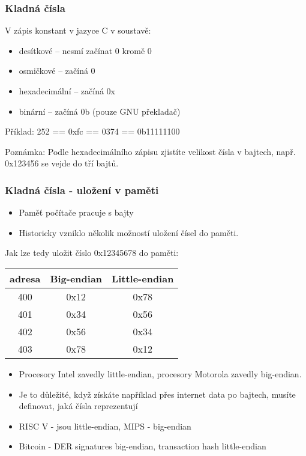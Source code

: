\documentclass{beamer}
\begin{document}
\begin{frame}
\frametitle{Kladná čísla}
V zápis konstant v jazyce C v soustavě:
\begin{itemize}
\item desítkové -- nesmí začínat 0 kromě 0
\item osmičkové -- začíná 0
\item hexadecimální -- začíná 0x
\item binární -- začíná 0b (pouze GNU překladač)
\end{itemize}
\bigskip
Příklad: 252 == 0xfc == 0374 == 0b11111100
\bigskip

Poznámka: Podle hexadecimálního zápisu zjistíte velikost čísla v bajtech, např. 0x123456 se vejde do tří bajtů.
\end{frame}


\begin{frame}
\frametitle{Kladná čísla - uložení v paměti}

\begin{itemize}
\item Paměť počítače pracuje s bajty
\item Historicky vzniklo několik možností uložení čísel do paměti.
\end{itemize}

Jak lze tedy uložit číslo 0x12345678 do paměti:
\begin{tabular}{|c|c|c|}\hline
adresa & Big-endian & Little-endian \\ \hline
400 & 0x12 & 0x78 \\ \hline
401 & 0x34 & 0x56 \\ \hline
402 & 0x56 & 0x34 \\ \hline
403 & 0x78 & 0x12 \\ \hline
\end{tabular}

\begin{itemize}
\item Procesory Intel zavedly little-endian, procesory Motorola zavedly big-endian.
\item Je to důležité, když získáte například přes internet data po bajtech, musíte definovat, jaká čísla reprezentují
\item RISC V - jsou little-endian, MIPS - big-endian
\item Bitcoin - DER signatures big-endian, transaction hash little-endian
\end{itemize}
\end{frame}
\end{document}

